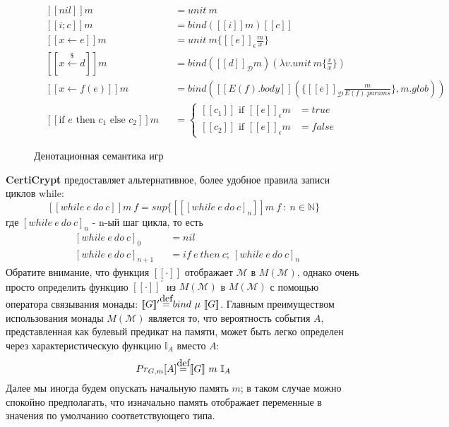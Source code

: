 \documentclass[a4paper,12pt]{report}
\newcommand\myeq{\stackrel{\mathclap{\normalfont\mbox{def}}}{=}}
\begin{document}
\begin{figure}[h]
\begin{align*}
 & [\![nil]\!] m & &= unit \  m \\
 & [\![i; c]\!] m & &= bind ( [\![i]\!] m) [\![c]\!] \\
 & [\![x \gets e]\!] m & &= unit \ m\{ [\![e]\!]_\epsilon \frac{m}{x} \} \\
 & [\![x \xleftarrow{\$} d]\!] m & &= bind ( [\![d]\!]_{\mathcal{D}} m ) (\lambda v. unit \ m \{ \frac{v}{x} \}) \\
  & [\![x \gets f(e)]\!] m & &= bind( [\![E(f).body]\!] ( \{ [\![e]\!]_\mathcal{D} \frac{m}{E(f).params}\}, m.glob))\\
  & [\![\text{if } e \text{ then } c_1 \text{ else } c_2 ]\!] m & &= \begin{cases} [\![c_1]\!]  \text{ if } [\![e]\!]_\epsilon m &= true \\ [\![c_2]\!]  \text{ if } [\![e]\!]_\epsilon m &= false \end{cases}
\end{align*}
\caption{Денотационная семантика игр}
\end{figure}
\textbf{CertiCrypt} предоставляет альтернативное, более удобное правила записи циклов while:
\[ [\![while \ e \  do \  c]\!] m \  f = sup\{ [\![[while \  e \  do \  c]_n]\!] m \  f \  : \  n \in \mathbb{N}\}\]
где $[while \ e \ do \ c]_n$ - n-ый шаг цикла, то есть
\begin{align*}
  &[while \ e \ do \ c]_0 &  &= nil \\
  &[while \ e \ do \ c]_{n+1} &  &= if \ e \ then \ c;\ [while \ e \ do \ c]_n
\end{align*}
Обратите внимание, что функция $[\![\cdot]\!]$ отображает $\mathcal{M}$ в $M(\mathcal{M})$, однако очень просто определить функцию $[\![\cdot]\!]^\prime$ из $M(\mathcal{M})$ в $M(\mathcal{M})$ с помощью оператора связывания монады: $[\![G]\!]^\prime \myeq bind \ \mu \ [\![G]\!]$. Главным преимуществом использования монады $M(\mathcal{M})$ является то, что вероятность события $A$, представленная как булевый предикат на памяти, может быть легко определен через характеристическую функцию $\mathbb{I}_A$ вместо $A$:
\begin{equation}\label{eq:eq1}
Pr_{G, m}[A] \myeq [\![G]\!] \  m \ \mathbb{I}_A  
\end{equation}
Далее мы иногда будем опускать начальную память $m$; в таком случае можно спокойно предполагать, что изначально память отображает переменные в значения по умолчанию соответствующего типа.
\end{document}
